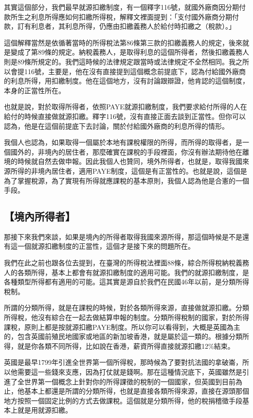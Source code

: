 \documentclass[]{ctexbook}
\begin{document}
其實這個部分，我們最早就源扣繳制度，有一個釋字116號，就國外廠商因分期付款所生之利息所得應如何扣繳所得稅，解釋文裡面提到：「支付國外廠商分期付款，訂有利息者，其利息所得，仍應由扣繳義務人於給付時扣繳之（稅款）。」

這個解釋當然是依循著當時的所得稅法第86條第三款的扣繳義務人的規定，後來就是變成了第89條的規定。納稅義務人，是取得利息的這個所得者，然後扣繳義務人則是89條所規定的。我們這時候的法律規定跟當時或法律規定不全然相同。我之所以會提116號，主要是，他在沒有直接提到這個概念前提底下，認為付給國外廠商的利息所得，用扣繳制度。他在這個地方，沒有討論跟辯證，他肯認的這個制度，本身的正當性所在。

也就是說，對於取得所得者，依照PAYE就源扣繳制度，我們要求給付所得的人在給付的時候直接做就源扣繳。釋字116號，沒有直接正面去談到正當性。但你可以認為，他是在這個前提底下去討論，關於付給國外廠商的利息所得的情形。

我個人也認為，如果取得一個屬於本地有課稅權限的所得，而所得的取得者，是一個國外的，非境內的居住者，那麼確實在課稅的手段裡面，你沒有辦法期待他在離境的時候就自然去做申報。因此我個人也贊同，境外所得者，也就是，取得我國來源所得的非境內居住者，適用PAYE制度，這個是有正當性的。也就是說，這個是為了掌握稅源，為了實現有所得就應課稅的基本原則，我個人認為他是合憲的一個手段。

\hypertarget{ux5883ux5167ux6240ux5f97ux8005}{%
\subsection{【境內所得者】}\label{ux5883ux5167ux6240ux5f97ux8005}}

那接下來我們來談，如果是境內的所得者取得我國來源所得，那這個時候是不是還有這一個就源扣繳制度的正當性，這個才是接下來的問題所在。

我們在此之前也跟各位去提到，在臺灣的所得稅法裡面88條，綜合所得稅納稅義務人的各類所得，基本上都會有就源扣繳制度的適用可能。我們的就源扣繳制度，是各種類型所得都有適用的可能。這其實是源自於我們在民國46年以前，是分類所得稅制。

所謂的分類所得，就是在課稅的時候，對於各類所得來源，直接做就源扣繳。分類所得稅，他沒有綜合在一起去做結算申報的制度。分類所得稅制的國家，對於所得課稅，原則上都是按就源扣繳PAYE制度。所以你可以看得到，大概是英國為主的，包含英國前殖民地國家或地區的新加坡香港，就是屬於這一類的。根據分類所得，就是你各類不同所得，比如說在香港，薪資所得直接就源扣繳12\%結束。

英國是最早1799年引進全世界第一個所得稅，那時候為了要對抗法國的拿破崙，所以他需要這一些錢來支應，因為打仗就是錢啊。那在這種情況底下，英國雖然是引進了全世界第一個概念上針對你的所得課徵的稅制的一個國家，但英國到目前為止，他基本上都還是所謂的分類所得，也就是直接各類所得來源，直接在源頭那個地方按照一個固定比例的方式去做課稅。這個就是分類所得，他的稅捐稽徵手段基本上就是用就源扣繳。
\end{document}
